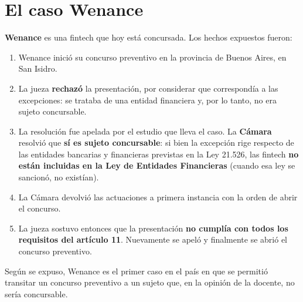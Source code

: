 \documentclass[12pt,oneside]{book}
\begin{document}
\section{El caso Wenance}

\textbf{Wenance} es una fintech que hoy está concursada. Los hechos expuestos fueron:

\begin{enumerate}
    \item Wenance inició su concurso preventivo en la provincia de Buenos Aires, en San Isidro.
    \item La jueza \textbf{rechazó} la presentación, por considerar que correspondía a las excepciones: se trataba de una entidad financiera y, por lo tanto, no era sujeto concursable.
    \item La resolución fue apelada por el estudio que lleva el caso. La \textbf{Cámara} resolvió que \textbf{sí es sujeto concursable}: si bien la excepción rige respecto de las entidades bancarias y financieras previstas en la Ley 21.526, las fintech \textbf{no están incluidas en la Ley de Entidades Financieras} (cuando esa ley se sancionó, no existían).
    \item La Cámara devolvió las actuaciones a primera instancia con la orden de abrir el concurso.
    \item La jueza sostuvo entonces que la presentación \textbf{no cumplía con todos los requisitos del artículo 11}. Nuevamente se apeló y finalmente se abrió el concurso preventivo.
\end{enumerate}

\begin{important}
Según se expuso, Wenance es el primer caso en el país en que se permitió transitar un concurso preventivo a un sujeto que, en la opinión de la docente, no sería concursable.
\end{important}
\end{document}
